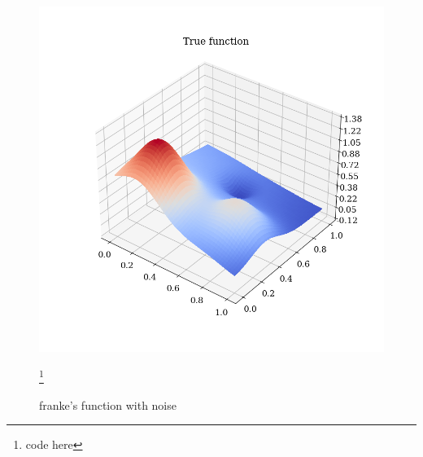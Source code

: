 \documentclass[twoside,11pt]{report}
\begin{document}
\begin{figure}
\begin{center}
    \begin{adjustbox}{clip,trim=4cm 3.4cm 3cm 4.8cm, max width=0.3\textwidth}
    \includegraphics{../runsAndAdditions/trueFunction.png}
    \end{adjustbox}
    \caption{\small franke's function with noise}
    \footnote{code here}
    \end{center}
\end{figure}
\end{document}
